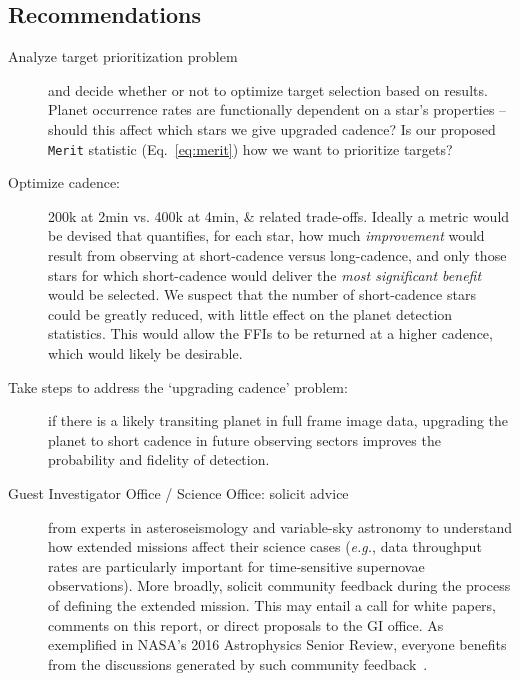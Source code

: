 \subsection{Recommendations}
\label{sec:recommendations}
\begin{description}
  
	\item[Analyze target prioritization problem] and decide whether or not to optimize target selection based on results. %
	Planet occurrence rates are functionally dependent on a star's properties -- should this affect which stars we give upgraded cadence?
	Is our proposed \texttt{Merit} statistic (Eq.~\ref{eq:merit}) how we want to prioritize targets?
	
      \item[Optimize cadence:] 200k at 2min vs. 400k at 4min, \&
        related trade-offs.  Ideally a metric would be devised that
        quantifies, for each star, how much {\it improvement} would
        result from observing at short-cadence versus long-cadence,
        and only those stars for which short-cadence would deliver the
        {\it most significant benefit} would be selected.  We suspect
        that the number of short-cadence stars could be greatly
        reduced, with little effect on the planet detection
        statistics. This would allow the FFIs to be returned at a
        higher cadence, which would likely be desirable.
	
	\item[Take steps to address the `upgrading cadence' problem:]
          if there is a likely transiting planet in full frame image
          data, upgrading the planet to short cadence in future
          observing sectors improves the probability and fidelity of
          detection.
	
	\item[Guest Investigator Office / \tess Science Office:
          solicit advice] from experts in asteroseismology and
          variable-sky astronomy to understand how extended missions
          affect their science cases (\textit{e.g.}, data throughput
          rates are particularly important for time-sensitive
          supernovae observations).  More broadly, solicit community
          feedback during the process of defining the extended
          mission.  This may entail a call for white papers, comments
          on this report, or direct proposals to the GI office.  As
          exemplified in NASA’s 2016 Astrophysics Senior Review,
          everyone benefits from the discussions generated by such
          community feedback~\citep{donahue_senior_2016}.
	

\end{description}
